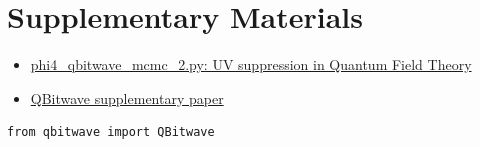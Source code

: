 \documentclass[11pt]{article}
\begin{document}
\section*{Supplementary Materials}

\begin{itemize}
\item \href{simulations/phi4\_qbitwave\_mcmc\_2.py}{phi4\_qbitwave\_mcmc\_2.py: UV suppression in Quantum Field Theory}
\item \href{supplementary-qbitwave.pdf}{QBitwave supplementary paper}
\end{itemize}


\begin{verbatim}
from qbitwave import QBitwave
\end{verbatim}

\printbibliography
\end{document}
